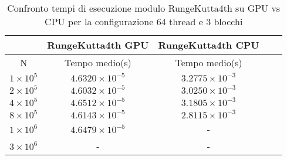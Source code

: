 \begin{table}[ht!]
    \begin{center}
        \renewcommand{\arraystretch}{1.5}
        \begin{adjustbox}{width=.51\textwidth}
            \begin{tabular}{ |c|c|c|c|c| }
                \hline
                \multicolumn{1}{|c}{} & \multicolumn{1}{|c}{RungeKutta4th GPU} & \multicolumn{1}{|c|}{RungeKutta4th CPU} \\
                \hline
                 N & Tempo medio(s) & Tempo medio(s) \\
                \hline 
                $1 \times 10^5$ & $4.6320 \times 10^{-5}$ & $3.2775 \times 10^{-3}$ \\ 
                \hline 
                $2 \times 10^5$ & $4.6032 \times 10^{-5}$ & $3.0250 \times 10^{-3}$ \\ 
                \hline 
                $4 \times 10^5$ & $4.6512 \times 10^{-5}$ & $3.1805 \times 10^{-3}$ \\ 
                \hline
                $8 \times 10^5$ & $4.6143 \times 10^{-5}$ & $2.8115 \times 10^{-3}$ \\ 
                \hline 
                $1 \times 10^6$ & $4.6479 \times 10^{-5}$ & - \\ 
                \hline 
                $3 \times 10^6$ & - & - \\ 
                \hline 
            \end{tabular}
        \end{adjustbox}
    \end{center}
    \caption{Confronto tempi di esecuzione modulo RungeKutta4th su GPU vs CPU per la configurazione 64 thread e 3 blocchi}
    \label{tab:rk4_kernel_table_64x3}
\end{table}

